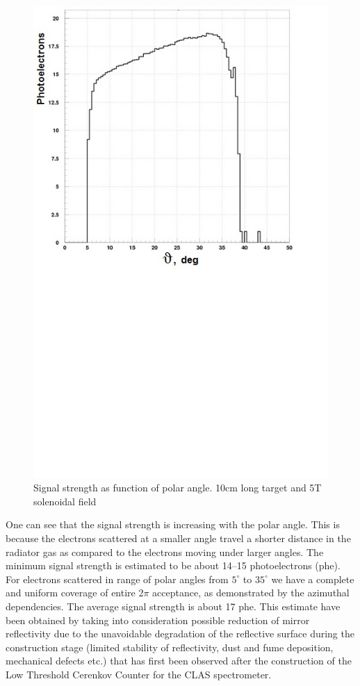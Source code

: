 \begin{figure}[!ht]
    \centering
    \includegraphics[width=1.0\linewidth,trim={0.0cm 9.4cm 0.0cm 0.0cm},clip]{images/10cm_Targ_5T_Field_Theta.jpg}
    \caption{Signal strength as function of polar angle. 10cm long target and 5T solenoidal field}
    \label{fig:10cm_Targ_5T_Field_Theta}
\end{figure}

One can see that the signal strength is increasing with the polar angle. This is because the electrons scattered at a smaller angle travel a shorter distance in the radiator gas as compared to the electrons moving under larger angles. The minimum signal strength is estimated to be about 14–15 photoelectrons (phe). For electrons scattered in range of polar angles from $5^\circ$ to $35^\circ$
we have a complete and uniform coverage of entire 2$\pi$ acceptance, as demonstrated by the azimuthal dependencies. The average signal strength is about 17 phe. This estimate have been obtained by taking into consideration possible reduction of mirror reflectivity due to the unavoidable degradation of the reflective surface during the construction stage (limited stability of reflectivity, dust and fume deposition, mechanical defects etc.) that has first been observed after the construction of the Low Threshold Cerenkov Counter for the CLAS spectrometer.

